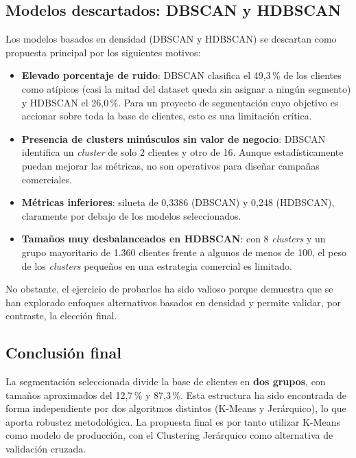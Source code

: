 \documentclass[11pt,a4paper]{article}
\begin{document}
\subsection{Modelos descartados: DBSCAN y HDBSCAN}

Los modelos basados en densidad (DBSCAN y HDBSCAN) se descartan como propuesta principal por los siguientes motivos:

\begin{itemize}
    \item \textbf{Elevado porcentaje de ruido}: DBSCAN clasifica el 49,3\,\% de los clientes como atípicos (casi la mitad del dataset queda sin asignar a ningún segmento) y HDBSCAN el 26,0\,\%. Para un proyecto de segmentación cuyo objetivo es accionar sobre toda la base de clientes, esto es una limitación crítica.
    \item \textbf{Presencia de clusters minúsculos sin valor de negocio}: DBSCAN identifica un \textit{cluster} de solo 2 clientes y otro de 16. Aunque estadísticamente puedan mejorar las métricas, no son operativos para diseñar campañas comerciales.
    \item \textbf{Métricas inferiores}: silueta de 0,3386 (DBSCAN) y 0,248 (HDBSCAN), claramente por debajo de los modelos seleccionados.
    \item \textbf{Tamaños muy desbalanceados en HDBSCAN}: con 8 \textit{clusters} y un grupo mayoritario de 1.360 clientes frente a algunos de menos de 100, el peso de los \textit{clusters} pequeños en una estrategia comercial es limitado.
\end{itemize}

No obstante, el ejercicio de probarlos ha sido valioso porque demuestra que se han explorado enfoques alternativos basados en densidad y permite validar, por contraste, la elección final.

\subsection{Conclusión final}

La segmentación seleccionada divide la base de clientes en \textbf{dos grupos}, con tamaños aproximados del 12,7\,\% y 87,3\,\%. Esta estructura ha sido encontrada de forma independiente por dos algoritmos distintos (K-Means y Jerárquico), lo que aporta robustez metodológica. La propuesta final es por tanto utilizar K-Means como modelo de producción, con el Clustering Jerárquico como alternativa de validación cruzada.
\end{document}
